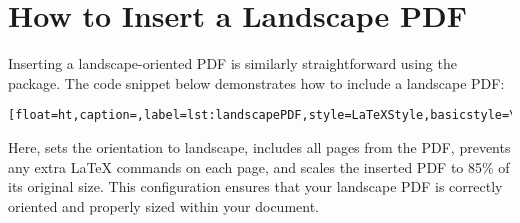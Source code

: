 		
	\section{How to Insert a Landscape PDF}
		Inserting a landscape-oriented PDF is similarly straightforward using the  package. 
		The code snippet below demonstrates how to include a landscape PDF:

		\begin{lstlisting}[float=ht,caption=,label=lst:landscapePDF,style=LaTeXStyle,basicstyle=\ttfamily,]

		\end{lstlisting}

		Here,  sets the orientation to landscape,  includes all pages from the PDF,  prevents any extra LaTeX commands on each page, and  scales the inserted PDF to 85\% of its original size. 
		This configuration ensures that your landscape PDF is correctly oriented and properly sized within your document.

		